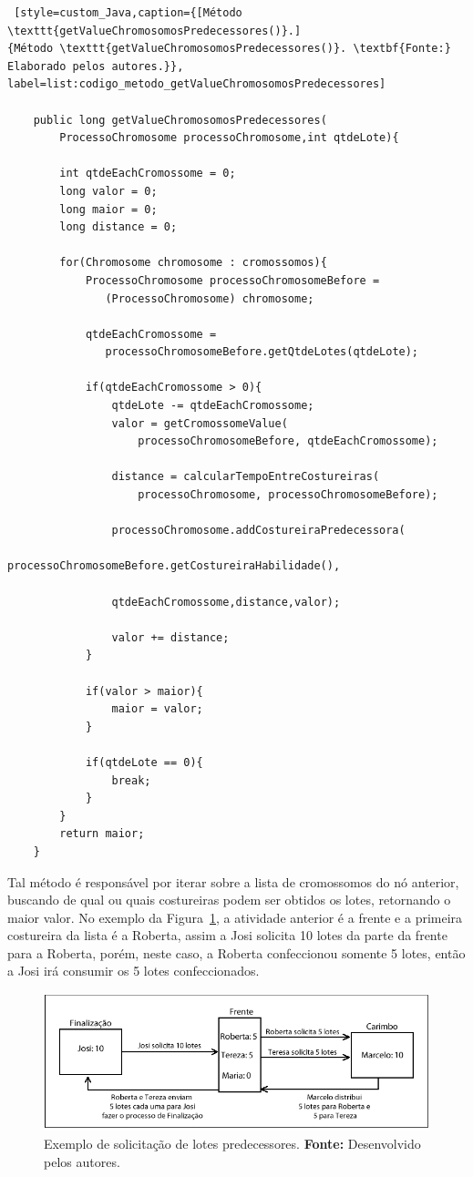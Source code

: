 \begin{lstlisting} [style=custom_Java,caption={[Método \texttt{getValueChromosomosPredecessores()}.]
{Método \texttt{getValueChromosomosPredecessores()}. \textbf{Fonte:} Elaborado pelos autores.}}, label=list:codigo_metodo_getValueChromosomosPredecessores] 	

	public long getValueChromosomosPredecessores(
		ProcessoChromosome processoChromosome,int qtdeLote){
	
		int qtdeEachCromossome = 0;
		long valor = 0;
		long maior = 0;
		long distance = 0;
		
		for(Chromosome chromosome : cromossomos){
			ProcessoChromosome processoChromosomeBefore =
			   (ProcessoChromosome) chromosome;
			
			qtdeEachCromossome =
			   processoChromosomeBefore.getQtdeLotes(qtdeLote);
			
			if(qtdeEachCromossome > 0){
				qtdeLote -= qtdeEachCromossome;
				valor = getCromossomeValue(
					processoChromosomeBefore, qtdeEachCromossome);
					
				distance = calcularTempoEntreCostureiras(
					processoChromosome, processoChromosomeBefore);
				
				processoChromosome.addCostureiraPredecessora(
					processoChromosomeBefore.getCostureiraHabilidade(), 
					
				qtdeEachCromossome,distance,valor);
				
				valor += distance;
			}
			
			if(valor > maior){
				maior = valor;
			}
			
			if(qtdeLote == 0){
				break;
			}
		}
		return maior;
	}	
\end{lstlisting}

\par Tal método é responsável por iterar sobre a lista de cromossomos do nó anterior, buscando de qual ou quais costureiras 
podem ser obtidos os lotes, retornando o maior valor. No exemplo da Figura~\ref{fig:ex_solicitaca_lotes}, a atividade anterior 
é a frente e a primeira costureira da lista é a Roberta, assim a Josi solicita 10 lotes da parte da frente para a Roberta, porém, 
neste caso, a Roberta confeccionou somente 5 lotes, então a Josi irá consumir os 5 lotes confeccionados.


\begin{figure}[h!]
	\centerline{\includegraphics[scale=1.2]{./imagens/distribuicao_exemplo_apresentacao.png}}
	\caption[Exemplo de solicitação de lotes predecessores.]
	{Exemplo de solicitação de lotes predecessores.
	\textbf{Fonte:} Desenvolvido pelos autores.}
	\label{fig:ex_solicitaca_lotes}
\end{figure}


